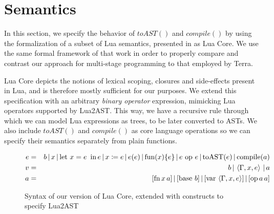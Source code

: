 \documentclass[english]{llncs}
\begin{document}
\section{Semantics}
\label{sec:semantics}

In this section, we specify the behavior of $toAST()$ and $compile()$
by using the formalization of a subset of Lua semantics, presented
in \cite{DeVito2013Terra} as Lua Core. We use the same formal framework
of that work in order to properly compare and contrast our approach
for multi-stage programming to that employed by Terra.

Lua Core depicts the notions of lexical scoping, closures and side-effects
present in Lua, and is therefore mostly sufficient for our purposes.
We extend this specification with an arbitrary \emph{binary operator}
expression, mimicking Lua operators supported by Lua2AST. This way,
we have a recursive rule through which we can model Lua expressions
as trees, to be later converted to ASTs. We also include $toAST()$ and
$compile()$ as core language operations so we can specify their semantics
separately from plain functions.

\begin{figure}[t]
\begin{eqnarray*}
e & = & b\,|\, x\,|\,\mbox{let \ensuremath{x=e}\,\ in\,\ensuremath{e}}\,|\, x\coloneqq e\,|\, e(e)\,|\,\mbox{fun}(x)\{e\}\,|\, e\mbox{ op }e\,|\,\mbox{toAST}(e)\,|\,\mbox{compile}(a)\\
v & = & b\,|\,\left\langle \Gamma,x,e\right\rangle \,|\, a\\
a & = & [\mbox{fn\,\ensuremath{x}\,\ensuremath{a}}]\,|\,[\mbox{base \ensuremath{b}}]\,|\,[\mbox{var}\,\left\langle \Gamma,x,e\right\rangle ]\,|\,[\mbox{op\,\ensuremath{a}\,\ensuremath{a}}]
\end{eqnarray*}
\protect\caption{\label{fig:LuaCoreSyntax}Syntax of our version of Lua Core, extended
with constructs to specify Lua2AST}
\end{figure}
\end{document}
